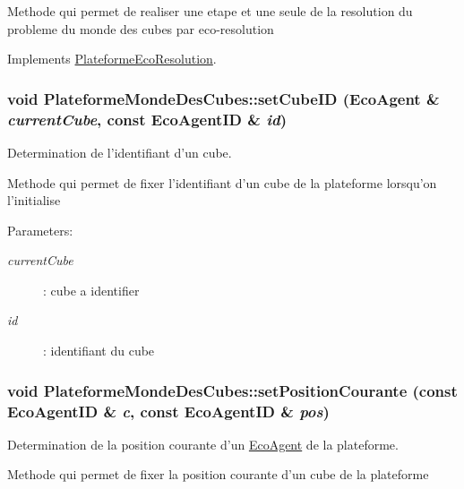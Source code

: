 Methode qui permet de realiser une etape et une seule de la resolution du probleme du monde des cubes par eco-resolution 

Implements \hyperlink{classPlateformeEcoResolution_17f587580cd8aee537551bc0ddd82bef}{PlateformeEcoResolution}.\hypertarget{classPlateformeMondeDesCubes_c99c6db4dfc2b193d8697103bec3d4d4}{
\subsubsection[{setCubeID}]{\setlength{\rightskip}{0pt plus 5cm}void PlateformeMondeDesCubes::setCubeID ({\bf EcoAgent} \& {\em currentCube}, \/  const {\bf EcoAgentID} \& {\em id})}}
\label{classPlateformeMondeDesCubes_c99c6db4dfc2b193d8697103bec3d4d4}


Determination de l'identifiant d'un cube. 

Methode qui permet de fixer l'identifiant d'un cube de la plateforme lorsqu'on l'initialise

\begin{Desc}
\item[Parameters:]
\begin{description}
\item[{\em currentCube}]: cube a identifier \item[{\em id}]: identifiant du cube \end{description}
\end{Desc}
\hypertarget{classPlateformeMondeDesCubes_ecc518787fb8231be37e7b8eb3c5390e}{
\subsubsection[{setPositionCourante}]{\setlength{\rightskip}{0pt plus 5cm}void PlateformeMondeDesCubes::setPositionCourante (const {\bf EcoAgentID} \& {\em c}, \/  const {\bf EcoAgentID} \& {\em pos})}}
\label{classPlateformeMondeDesCubes_ecc518787fb8231be37e7b8eb3c5390e}


Determination de la position courante d'un \hyperlink{classEcoAgent}{EcoAgent} de la plateforme. 

Methode qui permet de fixer la position courante d'un cube de la plateforme

